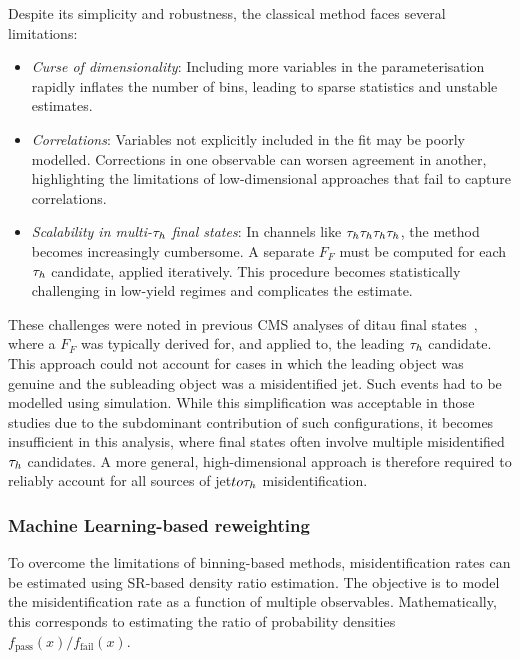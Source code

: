 Despite its simplicity and robustness, the classical method faces several limitations:

\begin{itemize}
\item \textit{Curse of dimensionality}: Including more variables in the parameterisation rapidly inflates the number of bins, leading to sparse statistics and unstable estimates.

\item \textit{Correlations}: Variables not explicitly included in the fit may be poorly modelled. Corrections in one observable can worsen agreement in another, highlighting the limitations of low-dimensional approaches that fail to capture correlations.

\item \textit{Scalability in multi-$\tau_h$ final states}: In channels like $\tau_h \tau_h \tau_h \tau_h$, the method becomes increasingly cumbersome. A separate $F_F$ must be computed for each $\tau_h$ candidate, applied iteratively. This procedure becomes statistically challenging in low-yield regimes and complicates the estimate.
\end{itemize}

These challenges were noted in previous \ac{CMS} analyses of ditau final states~\cite{CMS:2022goy,Mb:2022rxu}, where a $F_F$ was typically derived for, and applied to, the leading $\tau_h$ candidate. This approach could not account for cases in which the leading object was genuine and the subleading object was a misidentified jet. Such events had to be modelled using simulation. While this simplification was acceptable in those studies due to the subdominant contribution of such configurations, it becomes insufficient in this analysis, where final states often involve multiple misidentified $\tau_h$ candidates. A more general, high-dimensional approach is therefore required to reliably account for all sources of jet$to\tau_h$ misidentification.


\subsubsection{Machine Learning-based reweighting}
\label{Section:Chapter6_FakeFactors_BDT}

To overcome the limitations of binning-based methods, misidentification rates can be estimated using \ac{SR}-based density ratio estimation. The objective is to model the misidentification rate as a function of multiple observables. Mathematically, this corresponds to estimating the ratio of probability densities $f_{\text{pass}}(x)/f_{\text{fail}}(x)$.

